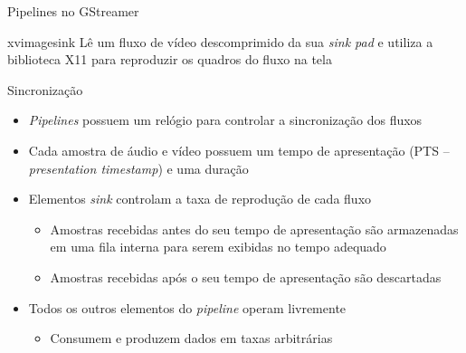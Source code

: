 \documentclass{beamer}
\def\en#1{\foreignlanguage{english}{\emph{#1}}}
\begin{document}
\begin{frame}[c]{Pipelines no GStreamer}
  \begin{block}{xvimagesink}
    Lê um fluxo de vídeo descomprimido da sua \en{sink pad} e utiliza
    a biblioteca X11 para reproduzir os quadros do fluxo na tela
  \end{block}

  \begin{figure}
    \centering
  \end{figure}
\end{frame}

\begin{frame}[c]{Sincronização}
  \begin{itemize}
    \item \en{Pipelines} possuem um relógio para controlar a sincronização
      dos fluxos
    \item Cada amostra de áudio e vídeo possuem um tempo de apresentação
      (PTS -- \en{presentation timestamp}) e uma duração
    \item Elementos \en{sink} controlam a taxa de reprodução de cada
      fluxo
      \begin{itemize}
        \item Amostras recebidas antes do seu tempo de apresentação são
          armazenadas em uma fila interna para serem exibidas no
          tempo adequado
        \item Amostras recebidas após o seu tempo de apresentação são
          descartadas
      \end{itemize}
    \item Todos os outros elementos do \en{pipeline} operam livremente
      \begin{itemize}
        \item Consumem e produzem dados em taxas arbitrárias
      \end{itemize}
  \end{itemize}
\end{frame}
\end{document}
